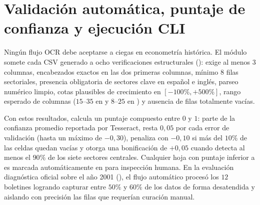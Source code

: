 \documentclass[12pt,letterpaper]{article}
\begin{document}
\section{Validación automática, puntaje de confianza y ejecución CLI}

Ningún flujo OCR debe aceptarse a ciegas en econometría histórica. El módulo  somete cada CSV generado a ocho verificaciones estructurales (): exige al menos \(3\) columnas, encabezados exactos en las dos primeras columnas, mínimo \(8\) filas sectoriales, presencia obligatoria de sectores clave en español e inglés, parseo numérico limpio, cotas plausibles de crecimiento en \([-100\%, +500\%]\), rango esperado de columnas (\(15\text{--}35\) en  y \(8\text{--}25\) en ) y ausencia de filas totalmente vacías.

Con estos resultados,  calcula un puntaje compuesto entre \(0\) y \(1\): parte de la confianza promedio reportada por Tesseract, resta \(0{,}05\) por cada error de validación (hasta un máximo de \(-0{,}30\)), penaliza con \(-0{,}10\) si más del \(10\%\) de las celdas quedan vacías y otorga una bonificación de \(+0{,}05\) cuando detecta al menos el \(90\%\) de los siete sectores centrales. Cualquier hoja con puntaje inferior a  es marcada automáticamente en  para inspección humana. En la evaluación diagnóstica oficial sobre el año 2001 (), el flujo automático procesó los \(12\) boletines logrando capturar entre \(50\%\) y \(60\%\) de los datos de forma desatendida y aislando con precisión las filas que requerían curación manual.
\end{document}
